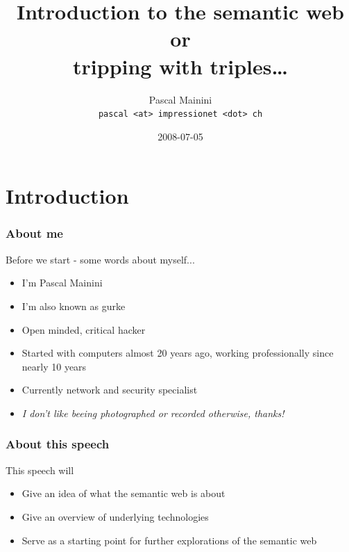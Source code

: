 \documentclass{beamer}
\title{Introduction to the semantic web \\ 
or \\
tripping with triples\ldots}
\author{
Pascal Mainini\\
\texttt{pascal <at> impressionet <dot> ch}\\
}
\date{2008-07-05}
\begin{document}
    \begin{frame}
        \titlepage
    \end{frame}

    \section{Introduction}

        \begin{frame}
            \frametitle{About me}

            Before we start - some words about myself...
            \vskip 0.7cm
            \pause

            \begin{itemize}
                \item I'm Pascal Mainini
                \pause
                \item I'm also known as gurke 
                \pause
                \item Open minded, critical hacker
                \pause
                \item Started with computers almost 20 years ago, working professionally since nearly 10 years
                \pause
                \item Currently network and security specialist
                \pause
                \item \textit{I don't like beeing photographed or recorded otherwise, thanks!}
            \end{itemize}
        \end{frame}

        \begin{frame}
            \frametitle{About this speech}

            This speech will
            \vskip 0.7cm
            \pause

            \begin{itemize}
                \item Give an idea of what the semantic web is about
                \pause
                \item Give an overview of underlying technologies
                \pause
                \item Serve as a starting point for further explorations of the semantic web
            \end{itemize}
        \end{frame}
\end{document}
